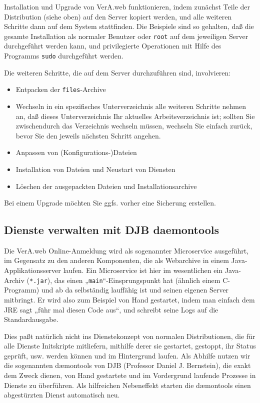 Installation und Upgrade von VerA.web funktionieren, indem
zunächst Teile der Distribution (siehe oben) auf den Server
kopiert werden, und alle weiteren Schritte dann auf dem System
stattfinden. Die Beispiele sind so gehalten, daß die gesamte
Installation als normaler Benutzer oder \texttt{root} auf dem
\ifoa
jeweiligen
\fi%
Server durchgeführt werden kann, und privilegierte Operationen
mit Hilfe des Programms \texttt{sudo} durchgeführt werden.

Die weiteren Schritte, die auf dem Server durchzuführen sind,
involvieren:\keinumbruch

\begin{itemize}
 \item{Entpacken der \texttt{files}-Archive}
 \item{Wechseln in ein spezifisches Unterverzeichnis \dash
  alle weiteren Schritte nehmen an, daß dieses Unterverzeichnis
  Ihr aktuelles Arbeitsverzeichnis ist; sollten Sie zwischendurch
  das Verzeichnis wechseln müssen, wechseln Sie einfach zurück,
  bevor Sie den jeweils nächsten Schritt angehen.}
 \item{Anpassen von (Konfigurations-)Dateien}
 \item{Installation von Dateien und Neustart von Diensten}
 \item{Löschen der ausgepackten Dateien und Installationsarchive}
\end{itemize}

Bei einem Upgrade möchten Sie ggfs. vorher eine Sicherung erstellen.

\ifoa

\subsection{Dienste verwalten mit DJB daemontools}\label{subsec:intro-svc}

Die VerA.web Online-Anmeldung wird als sogenannter Microservice
ausgeführt, im Gegensatz zu den anderen Komponenten, die als
Webarchive in einem Java-Applikationsserver laufen. Ein Microservice
ist hier im wesentlichen ein Java-Archiv (\texttt{*.jar}), das einen
„\texttt{main}“-Einsprungspunkt hat (ähnlich einem C-Programm) und ab
da selbständig lauffähig ist und seinen eigenen Server mitbringt. Er
wird also zum Beispiel von Hand gestartet, indem man einfach dem JRE
sagt „führ mal diesen Code aus“, und schreibt seine Logs auf die
Standardausgabe.

Dies paßt natürlich nicht ins Dienstekonzept von normalen Distributionen,
die für alle Dienste Initskripte mitliefern, mithilfe derer sie gestartet,
gestoppt, ihr Status geprüft, usw. werden können und im Hintergrund laufen.
Als Abhilfe nutzen wir die sogenannten dæmontools von DJB (Professor Daniel
J. Bernstein), die exakt dem Zweck dienen, von Hand gestartete und im
Vordergrund laufende Prozesse in Dienste zu überführen. Als hilfreichen
Nebeneffekt starten die dæmontools einen abgestürzten Dienst automatisch neu.

